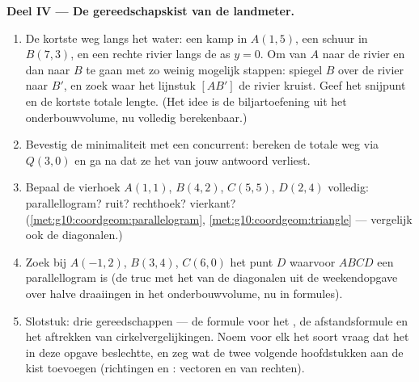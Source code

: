\begin{problem}
\medskip
\noindent\textbf{Deel IV --- De gereedschapskist van de landmeter.}
\begin{enumerate}[resume]
  \item De kortste weg langs het water: een kamp in $A(1, 5)$, een schuur in
        $B(7, 3)$, en een rechte rivier langs de as $y = 0$. Om van $A$ naar
        de rivier en dan naar $B$ te gaan met zo weinig mogelijk stappen:
        spiegel $B$ over de rivier naar $B'$, en zoek waar het lijnstuk
        $[AB']$ de rivier kruist. Geef het snijpunt en de kortste totale
        lengte. (Het idee is de biljartoefening uit het onderbouwvolume, nu
        volledig berekenbaar.)
  \item Bevestig de minimaliteit met een concurrent: bereken de totale weg
        via $Q(3, 0)$ en ga na dat ze het van jouw antwoord verliest.
  \item Bepaal de vierhoek $A(1,1)$, $B(4,2)$, $C(5,5)$, $D(2,4)$ volledig:
        parallellogram? ruit? rechthoek? vierkant?
        (\cref{met:g10:coordgeom:parallelogram},
        \cref{met:g10:coordgeom:triangle} --- vergelijk ook de diagonalen.)
  \item Zoek bij $A(-1, 2)$, $B(3, 4)$, $C(6, 0)$ het punt $D$ waarvoor
        $ABCD$ een parallellogram is (de truc met het  van de
        diagonalen uit de weekendopgave over halve draaiingen in het
        onderbouwvolume, nu in formules).
  \item Slotstuk: drie gereedschappen --- de formule voor het , de
        afstandsformule en het aftrekken van cirkelvergelijkingen. Noem voor
        elk het soort vraag dat het in deze opgave beslechtte, en zeg wat de
        twee volgende hoofdstukken aan de kist toevoegen (richtingen en
        : vectoren en  van rechten).
\end{enumerate}
\end{problem}
